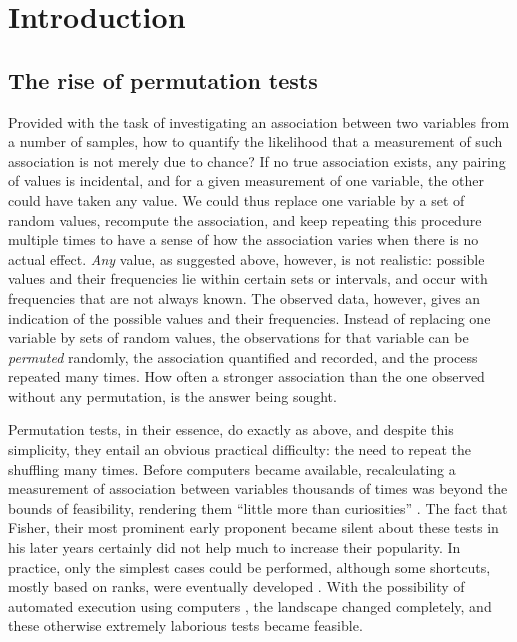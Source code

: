 \chapter{Introduction}
\label{sec:intro}
\setstretch{\lspac}

\section{The rise of permutation tests}

Provided with the task of investigating an association between two variables from a number of samples, how to quantify the likelihood that a measurement of such association is not merely due to chance? If no true association exists, any pairing of values is incidental, and for a given measurement of one variable, the other could have taken any value. We could thus replace one variable by a set of random values, recompute the association, and keep repeating this procedure multiple times to have a sense of how the association varies when there is no actual effect. \emph{Any} value, as suggested above, however, is not realistic: possible values and their frequencies lie within certain sets or intervals, and occur with frequencies that are not always known. The observed data, however, gives an indication of the possible values and their frequencies. Instead of replacing one variable by sets of random values, the observations for that variable can be \emph{permuted} randomly, the association quantified and recorded, and the process repeated many times. How often a stronger association than the one observed without any permutation, is the answer being sought.

Permutation tests, in their essence, do exactly as above, and despite this simplicity, they entail an obvious practical difficulty: the need to repeat the shuffling many times. Before computers became available, recalculating a measurement of association between variables thousands of times was beyond the bounds of feasibility, rendering them ``little more than curiosities'' \citep{Bradley1968}. The fact that Fisher, their most prominent early proponent \citep{Fisher1935} became silent about these tests in his later years \citep{Basu1980} certainly did not help much to increase their popularity. In practice, only the simplest cases could be performed, although some shortcuts, mostly based on ranks, were eventually developed \citep{Wilcoxon1945, Mann1947, Box1955}. With the possibility of automated execution using computers \citep{Efron1979}, the landscape changed completely, and these otherwise extremely laborious tests became feasible.

